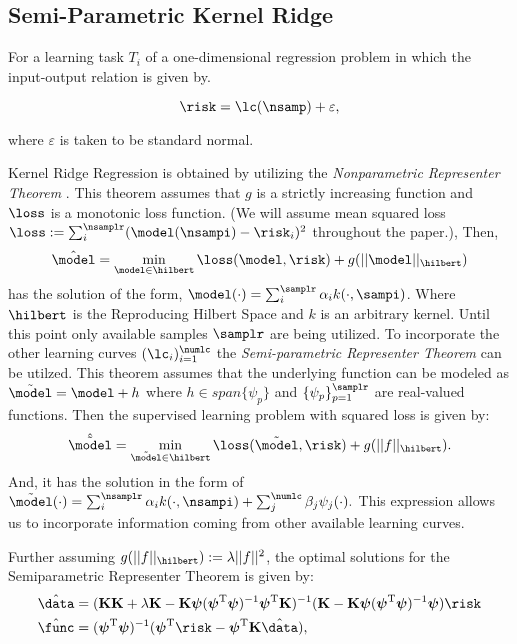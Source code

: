 \subsection{Semi-Parametric Kernel Ridge}

For a learning task $T_i$ of a one-dimensional regression problem in which the input-output relation is given by.

\begin{equation}\label{eq:data}
  \risk = \lc(\nsamp) + \varepsilon,
\end{equation}

where $\varepsilon$ is taken to be standard normal.

Kernel Ridge Regression is obtained by utilizing the \textit{Nonparametric Representer Theorem} \cite{scholkopf2002a}. This theorem assumes that $g$ is a strictly increasing function and $\loss$ is a monotonic loss function. (We will assume mean squared loss $\loss:=\sum_i^{\nsamplr}(\model(\nsampi)-\risk_i)^2$ throughout the paper.), Then,
\begin{equation}
  \hat{\model} = \min_{\model\in\hilbert} \loss(\model,\risk) + g(||\model||_\hilbert)
  \label{eq:min}
\end{equation} 
has the solution of the form, $\model(\cdot)=\sum^{\samplr}_i\alpha_i k(\cdot,\sampi)$. Where $\hilbert$ is the Reproducing Hilbert Space and $k$ is an arbitrary kernel. Until this point only available samples $\samplr$ are being utilized. To incorporate the other learning curves $(\lc_i)_{i=1}^\numlc$ the \textit{Semi-parametric Representer Theorem }\cite{scholkopf2002a} can be utilzed. This theorem assumes that the underlying function can be modeled as $\tilde{\model}= \model + h$ where $h\in span\{\psi_p\}$ and $\{\psi_p\}_{p=1}^\samplr$ are real-valued functions. Then the supervised learning problem with squared loss is given by:
\begin{equation}
  \hat{\tilde{\model}} = \min_{\tilde{\model}\in\hilbert} \loss(\tilde{\model},\risk) + g(||f||_\hilbert).
  \label{eq:min_semi}
\end{equation}  
And, it has the solution in the form of $\tilde{\model}(\cdot)=\sum_i^\nsamplr\alpha_i k(\cdot,\nsampi)+\sum_j^\numlc\beta_j\psi_j(\cdot).$
This expression allows us to incorporate information coming from other available learning curves. 

Further assuming $g(||f||_\hilbert):=\lambda||f||^2$, the optimal solutions for the Semiparametric Representer Theorem is given by:
\begin{align}
  \hat{\data}&=(\mathbf{K}\mathbf{K}+\lambda\mathbf{K}-\mathbf{K}\boldsymbol{\psi}(\boldsymbol{\psi}^\text{T}\boldsymbol{\psi})^{-1}\boldsymbol{\psi}^\text{T}\mathbf{K})^{-1}(\mathbf{K}-\mathbf{K}\boldsymbol{\psi}(\boldsymbol{\psi}^\text{T}\boldsymbol{\psi})^{-1}\boldsymbol{\psi})\boldsymbol{\risk} \\ 
  \hat{\func}&=(\boldsymbol{\psi}^\text{T}\boldsymbol{\psi})^{-1}(\boldsymbol{\psi}^\text{T}\boldsymbol{\risk}-\boldsymbol{\psi}^\text{T}\mathbf{K}\hat{\data}),
\label{eq:opt}
\end{align}


